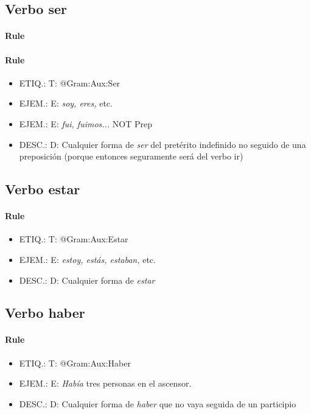 \documentclass[11pt]{report}
\begin{document}
\subsection{Verbo ser}
\paragraph*{Rule}
\paragraph*{Rule}
\begin{itemize}
\item ETIQ.:  T: @Gram:Aux:Ser
\item EJEM.:  E: \emph{soy, eres,} etc. 
\item EJEM.:  E: \emph{fui, fuimos...} NOT Prep 
\item DESC.:  D: Cualquier forma de \emph{ser} del pretérito indefinido no seguido de una preposición (porque entonces seguramente será del verbo ir)
\end{itemize}

\subsection{Verbo estar}
\paragraph*{Rule}
\begin{itemize}
\item ETIQ.:  T: @Gram:Aux:Estar
\item EJEM.:  E: \emph{estoy, estás, estaban,} etc. 
\item DESC.:  D: Cualquier forma de \emph{estar}
\end{itemize}

\subsection{Verbo haber}
\paragraph*{Rule}
\begin{itemize}
\item ETIQ.:  T: @Gram:Aux:Haber
\item EJEM.:  E: \emph{Había} tres personas en el ascensor. 
\item DESC.:  D: Cualquier forma de \emph{haber} que no vaya seguida de un participio
\end{itemize}
\end{document}
